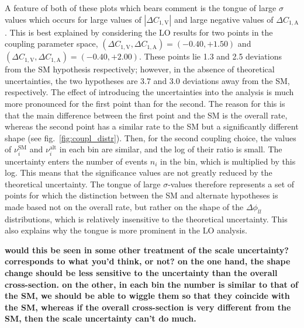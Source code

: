 \documentclass[preprint]{JHEP3} %
\newcommand{\SM}{\mathrm{SM}}
\newcommand{\alt}{\mathrm{alt}}
\def\Dphill{\Delta \phi_{ll}}
\def\DConeA{\Delta C_{1,\mathrm{A}}}
\def\DConeV{\Delta C_{1,\mathrm{V}}}
\begin{document}
A feature of both of these plots which bears comment is the tongue of large $\sigma$ values which occurs for large values of $| \DConeV|$ and large 
negative values of $\DConeA$. This is best explained by considering the LO results for two points in the coupling parameter space, 
$(\DConeV,\DConeA)=(-0.40,+1.50)$ and $(\DConeV,\DConeA)=(-0.40,+2.00)$. These points lie 1.3 and 2.5 deviations from the SM hypothesis respectively; 
however, in the absence of theoretical uncertainties, the two hypotheses are 3.7 and 3.0 deviations away from the SM, respectively. 
The effect of introducing the uncertainties into the analysis is much more pronounced for the first point than for the second. 
The reason for this is that the main difference between the first point and the SM is the overall rate, whereas the second point has a similar rate to the 
SM but a significantly different shape (see fig.~\ref{fig:coupl_distr}). Then, for the second coupling choice, the values of $\nu_i^{\SM}$ and $\nu_i^{\alt}$ 
in each bin are similar, and the 
log of their ratio is small. The uncertainty enters the number of events $n_i$ in the bin, which is multiplied by this log. 
This means that the significance values are not greatly reduced by the theoretical uncertainty. 
The tongue of large $\sigma$-values therefore represents a set of points for which the distinction between the SM and alternate hypotheses 
is made based not on the overall rate, but rather on the shape of the $\Dphill$ distributions, which is relatively insensitive to the theoretical uncertainty. 
This also explains why the tongue is more prominent in the LO analysis.

{\bf would this be seen in some other treatment of the scale uncertainty? corresponds to what you'd think, or not? on the one hand, 
the shape change should be less sensitive to the uncertainty than the overall cross-section. on the other, in each bin the number is similar to that of the SM, 
we should be able to wiggle them so that they coincide with the SM, whereas if the overall cross-section is very different from the SM, 
then the scale uncertainty can't do much. } 
\end{document}
